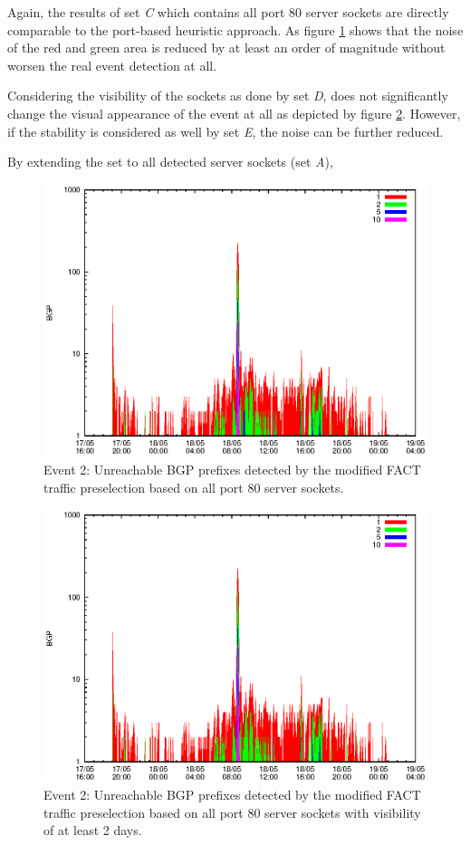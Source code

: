 Again, the results of set \emph{C} which contains all port 80 server sockets are 
directly comparable to the port-based heuristic approach. As figure 
\ref{fig:TIER1_FACT_allSES80} shows that the noise of the red and green area is 
reduced by at least an order of magnitude without worsen the real event 
detection at all.

Considering the visibility of the sockets as done by set \emph{D}, does not 
significantly change the visual appearance of the event at all as depicted by 
figure \ref{fig:TIER1_FACT_allSES80VTS2}. However, if the stability is 
considered as well by set \emph{E}, the noise can be further reduced. 

By extending the set to all detected server sockets (set \emph{A}), 

\begin{figure}
	[p] \centering 
	\includegraphics[width=0.75\linewidth]{images/events/2010_05_18/bgp_log_allPort80SES.eps}
	\caption{Event 2: Unreachable BGP prefixes detected by the modified FACT traffic preselection based on all port 80 server sockets.} 
	\label{fig:TIER1_FACT_allSES80} 
\end{figure}


\begin{figure}
	[p] \centering 
	\includegraphics[width=0.75\linewidth]{images/events/2010_05_18/bgp_log_port80_Set_stab_0_vts_2.eps}
	\caption{Event 2: Unreachable BGP prefixes detected by the modified FACT traffic preselection based on all port 80 server sockets with visibility of at least 2 days.} 
	\label{fig:TIER1_FACT_allSES80VTS2} 
\end{figure}


